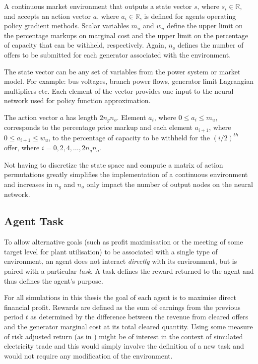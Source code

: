 A continuous market environment that outputs a state vector $s$, where $s_i
\in \mathbb{R}$, and accepts an action vector $a$, where $a_i \in \mathbb{R}$,
is defined for agents operating policy gradient methods.  Scalar variables $m_{u}$ and $w_{u}$ define the upper limit on the percentage
markups on marginal cost and the upper limit on the percentage of capacity that
can be withheld, respectively.  Again, $n_o$ defines the number of offers to be
submitted for each generator associated with the environment.

The state vector can be any set of variables from the power system or market
model.  For example: bus voltages, branch power flows, generator limit
Lagrangian multipliers etc.  Each element of the vector provides one input to the neural network used for policy function approximation.

The action vector $a$ has length $2n_gn_o$.  Element $a_i$, where $0\leq a_i
\leq m_{u}$, corresponds to the percentage price markup and each element
$a_{i+1}$, where $0\leq a_{i+1} \leq w_{u}$, to the percentage of capacity
to be withheld for the $(i/2)^{th}$ offer, where $i=0,2,4,\dotsc,2n_gn_o$.

Not having to discretize the state space and compute a matrix of action
permutations greatly simplifies the implementation of a continuous environment
and increases in $n_g$ and $n_o$ only impact the number of output nodes
on the neural network.

\subsection{Agent Task}
To allow alternative goals (such as profit maximisation or the meeting of some
target level for plant utilisation) to be associated with a single type of
environment, an agent does not interact \textit{directly} with its environment,
but is paired with a particular \textit{task}. A task defines the reward
returned to the agent and thus defines the agent's purpose.

For all simulations in this thesis the goal of each agent is to maximise direct
financial profit.  Rewards are defined as the sum of earnings from the previous
period $t$ as determined by the difference between the revenue from cleared
offers and the generator marginal cost at its total cleared quantity.  Using
some measure of risk adjusted return (as in \cite{moody:direct}) might be of
interest in the context of simulated electricity trade and this would simply
involve the definition of a new task and would not require any modification of
the environment.

